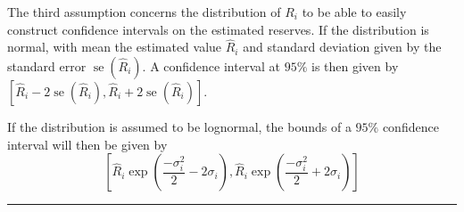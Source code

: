 \begin{f}
%

		

The third assumption concerns the distribution of \(R_{i}\) to be able to easily construct confidence intervals on the estimated reserves. If the distribution is normal, with mean the estimated value \(\hat{R}_{i}\) and standard deviation given by the standard error \(\operatorname{se}\left(\hat{R}_{i}\right)\). A confidence interval at \(95 \%\) is then given by \(\left[\hat{R}_{i}-2 \operatorname{se}\left(\hat{R}_{i}\right), \hat{R}_{i}+2 \operatorname{se}\left(\hat{R}_{i}\right)\right]\).

If the distribution is assumed to be lognormal, the bounds of a \(95\%\) confidence interval will then be given by
\[
\left[\hat{R}_{i} \exp \left(\frac{-\sigma_{i}^{2}}{2}-2 \sigma_{i}\right), \hat{R}_{i} \exp \left(\frac{-\sigma_{i}^{2}}{2}+2 \sigma_{i}\right)\right]
\]
		
\end{f}
\hrule

